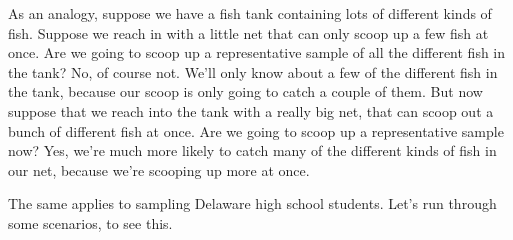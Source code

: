 \documentclass[../../../main.tex]{subfiles}
\begin{document}
As an analogy, suppose we have a fish tank containing lots of different kinds of fish. Suppose we reach in with a little net that can only scoop up a few fish at once. Are we going to scoop up a representative sample of all the different fish in the tank? No, of course not. We'll only know about a few of the different fish in the tank, because our scoop is only going to catch a couple of them. But now suppose that we reach into the tank with a really big net, that can scoop out a bunch of different fish at once. Are we going to scoop up a representative sample now? Yes, we're much more likely to catch many of the different kinds of fish in our net, because we're scooping up more at once.

The same applies to sampling Delaware high school students. Let's run through some scenarios, to see this.
\end{document}
